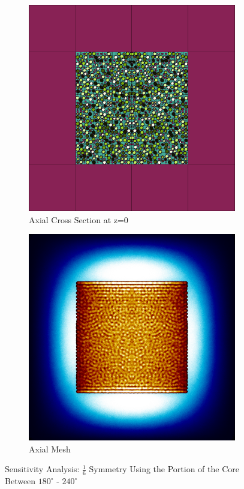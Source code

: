 \begin{figure}[H]
\begin{subfigure}{0.45\textwidth}
  \includegraphics[width=0.95\linewidth]{figures/180-240/180-240-v}
  \caption{Axial Cross Section at z=0 }
  \label{fig:180-240-v}
\end{subfigure}
%
\begin{subfigure}{0.45\textwidth}
  \includegraphics[width=0.95\linewidth]{figures/180-240/180-240-vm}
  \caption{Axial Mesh}
  \label{fig:180-240-vm}
\end{subfigure}
%
\caption{Sensitivity Analysis: $\frac{1}{6}$ Symmetry Using the Portion of the Core Between $180^{\circ}$ - $240^{\circ}$}
\label{fig:180-240}
\end{figure}